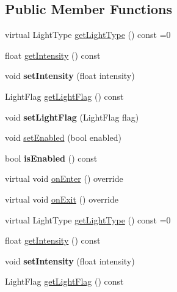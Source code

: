 \subsection*{Public Member Functions}
\begin{DoxyCompactItemize}
\item 
virtual Light\+Type \hyperlink{classBaseLight_a620db25fed828de7328b83587f388030}{get\+Light\+Type} () const =0
\item 
float \hyperlink{classBaseLight_a0e3da8811d6c8d3119551fb9b7f83683}{get\+Intensity} () const
\item 
\mbox{\label{classBaseLight_a83fd789faa34036e8d462ecdd6456297}} 
void {\bfseries set\+Intensity} (float intensity)
\item 
Light\+Flag \hyperlink{classBaseLight_a88a41452d717c2df935359bf82ed5946}{get\+Light\+Flag} () const
\item 
\mbox{\label{classBaseLight_ad1439099adec400aa7871091fa90f481}} 
void {\bfseries set\+Light\+Flag} (Light\+Flag flag)
\item 
void \hyperlink{classBaseLight_af3da106fbf57edbbfc9ca20319311bb6}{set\+Enabled} (bool enabled)
\item 
\mbox{\label{classBaseLight_afd1c35f75803529a0d8bb09b8cd4d1ae}} 
bool {\bfseries is\+Enabled} () const
\item 
virtual void \hyperlink{classBaseLight_a76470def8a65956abdb17b3d71c1a7a0}{on\+Enter} () override
\item 
virtual void \hyperlink{classBaseLight_a4a38c4061703339cee94ebf523b453a0}{on\+Exit} () override
\item 
virtual Light\+Type \hyperlink{classBaseLight_a620db25fed828de7328b83587f388030}{get\+Light\+Type} () const =0
\item 
float \hyperlink{classBaseLight_a0e3da8811d6c8d3119551fb9b7f83683}{get\+Intensity} () const
\item 
\mbox{\label{classBaseLight_a48251bdf49ad0cee9702c2954b3430fc}} 
void {\bfseries set\+Intensity} (float intensity)
\item 
Light\+Flag \hyperlink{classBaseLight_a88a41452d717c2df935359bf82ed5946}{get\+Light\+Flag} () const
\item 
\mbox{\label{classBaseLight_ad1439099adec400aa7871091fa90f481}} 

\end{DoxyCompactItemize}

